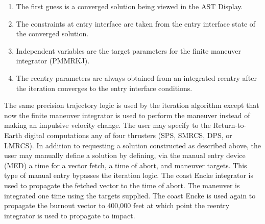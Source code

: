 \documentclass[11pt]{article} %
\begin{document}
\begin{enumerate}
	\item The first guess is a converged solution being viewed in the AST Display.
	\item The constraints at entry interface are taken from the entry interface state of the converged solution.
	\item Independent variables are the target parameters for the finite maneuver integrator (PMMRKJ).
	\item The reentry parameters are always obtained from an integrated reentry after the iteration converges to the entry interface conditions.
\end{enumerate}
The same precision trajectory logic is used by the iteration algorithm except that now the finite maneuver integrator is used to perform the maneuver instead of
making an impulsive velocity change. The user may specify to the Return-to-Earth digital computations any of four thrusters (SPS, SMRCS, DPS, or LMRCS).
In addition to requesting a solution constructed as described above, the user may manually define a solution by defining, via the manual entry device (MED) a time
for a vector fetch, a time of abort, and maneuver targets. This type of manual entry bypasses the iteration logic. The coast Encke integrator is used to propagate the fetched vector to the time of abort. The maneuver is integrated one time using the targets supplied. The coast Encke is used again to propagate the burnout vector to 400,000 feet at which point the reentry integrator is used to propagate to impact.
\end{document}
